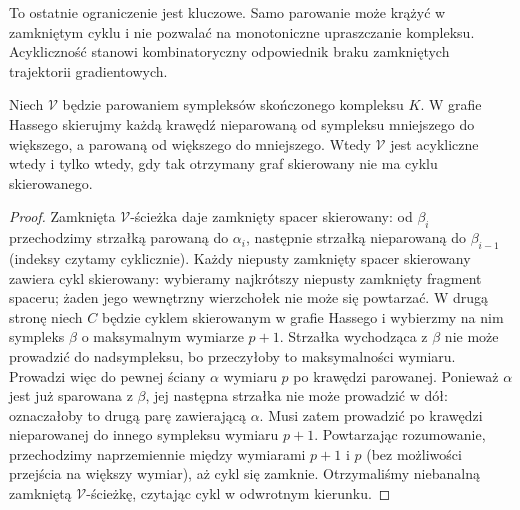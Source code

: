 To ostatnie ograniczenie jest kluczowe. Samo parowanie
może krążyć w zamkniętym cyklu i nie pozwalać na
monotoniczne upraszczanie kompleksu. Acykliczność
stanowi kombinatoryczny odpowiednik braku zamkniętych
trajektorii gradientowych.

\begin{stwierdzenie}
\label{thm:tg-morse-acyclic}
Niech $\mathcal V$ będzie parowaniem sympleksów
skończonego kompleksu $K$. W grafie Hassego skierujmy
każdą krawędź nieparowaną od sympleksu mniejszego do
większego, a parowaną od większego do mniejszego.
Wtedy $\mathcal V$ jest acykliczne wtedy i tylko wtedy,
gdy tak otrzymany graf skierowany nie ma cyklu skierowanego.
\end{stwierdzenie}

\begin{proof}
Zamknięta $\mathcal V$-ścieżka daje zamknięty spacer
skierowany: od $\beta_i$ przechodzimy strzałką parowaną
do $\alpha_i$, następnie strzałką nieparowaną do
$\beta_{i-1}$ (indeksy czytamy cyklicznie).
Każdy niepusty zamknięty spacer skierowany zawiera
cykl skierowany: wybieramy najkrótszy niepusty
zamknięty fragment spaceru; żaden jego wewnętrzny
wierzchołek nie może się powtarzać.
W drugą stronę niech $C$ będzie cyklem skierowanym
w grafie Hassego i wybierzmy na nim sympleks $\beta$
o maksymalnym wymiarze $p+1$. Strzałka wychodząca
z $\beta$ nie może prowadzić do nadsympleksu,
bo przeczyłoby to maksymalności wymiaru. Prowadzi
więc do pewnej ściany $\alpha$ wymiaru $p$ po
krawędzi parowanej. Ponieważ $\alpha$ jest już
sparowana z $\beta$, jej następna strzałka nie może
prowadzić w dół: oznaczałoby to drugą parę zawierającą
$\alpha$. Musi zatem prowadzić po krawędzi
nieparowanej do innego sympleksu wymiaru $p+1$.
Powtarzając rozumowanie, przechodzimy naprzemiennie
między wymiarami $p+1$ i $p$ (bez możliwości przejścia
na większy wymiar), aż cykl się zamknie. Otrzymaliśmy
niebanalną zamkniętą $\mathcal V$-ścieżkę,
czytając cykl w odwrotnym kierunku.
\end{proof}

